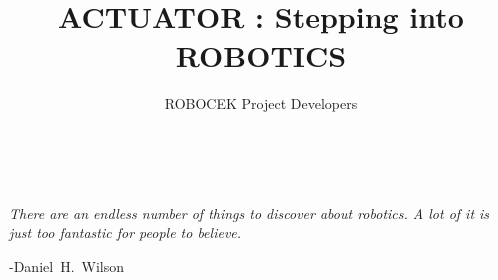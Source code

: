 \documentclass[oneside,openany]{tufte-book} %
\title{ACTUATOR : Stepping into ROBOTICS} %
\author{ROBOCEK Project Developers} %
\begin{document}
\frontmatter


\maketitle



\clearpage
~\vfill
\begin{fullwidth}
    \noindent\fontsize{18}{22}\selectfont\itshape \nohyphenation
    There are an endless number of things to discover about robotics. A lot of it is just too fantastic for people to believe.
    \par \begin{flushright} \mbox{-Daniel H. Wilson} \end{flushright} 
    \vfill \vfill
\end{fullwidth}






\end{document}
